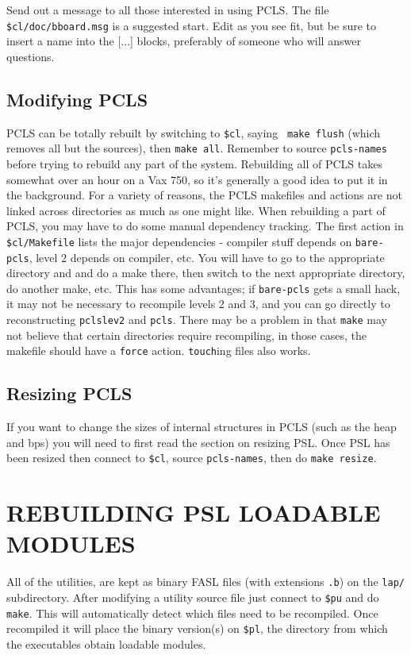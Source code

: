Send out a message to all those interested in using PCLS.  The file
{\tt \$cl/doc/bboard.msg} is a suggested start.  Edit as you see fit,
but be sure to insert a name into the [...] blocks, preferably of
someone who will answer questions.

\subsection{Modifying PCLS}

PCLS can be totally rebuilt by switching to {\tt \$cl}, saying {\tt
make flush} (which removes all but the sources), then {\tt make all}.
Remember to source {\tt pcls-names} before trying to rebuild any part
of the system.
Rebuilding all of PCLS takes somewhat over an hour on a Vax 750, so it's
generally a good idea to put it in the background.  For a variety of
reasons, the PCLS makefiles and actions are not linked across
directories as much as one might like.  When rebuilding a part of
PCLS, you may have to do some manual dependency tracking.  The first
action in {\tt \$cl/Makefile} lists the major dependencies - compiler
stuff depends on {\tt bare-pcls}, level 2 depends on compiler, etc.
You will have to go to the appropriate directory and and do a make
there, then switch to the next appropriate directory, do another make,
etc.  This has some advantages; if {\tt bare-pcls} gets a small hack,
it may not be necessary to recompile levels 2 and 3, and you can go
directly to reconstructing {\tt pclslev2} and {\tt pcls}.  There may
be a problem in that {\tt make} may not believe that certain
directories require recompiling, in those cases, the makefile should
have a {\tt force} action.  {\tt touch}ing files also works.

\subsection{Resizing PCLS}

If you want to change the sizes of internal structures in PCLS (such
as the heap and bps) you will need to first read the section on
resizing PSL.  Once PSL has been resized then connect to {\tt \$cl},
source {\tt pcls-names}, then do {\tt make resize}.

\section{REBUILDING PSL LOADABLE MODULES}

All of the utilities, are kept as binary FASL files (with extensions
{\tt .b}) on the {\tt lap/} subdirectory.  After modifying a utility source
file just connect to {\tt \$pu} and do {\tt make}.  This will
automatically detect which files need to be recompiled.  Once
recompiled it will place the binary version(s) on {\tt \$pl}, the
directory from which the executables obtain loadable modules.

